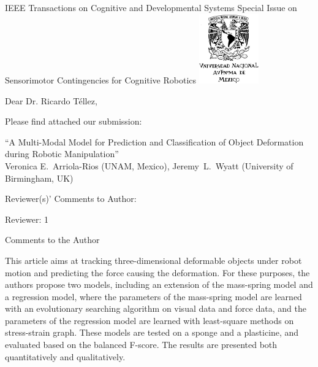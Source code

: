 \documentclass[a4paper,12pt]{letter}
\newcommand{\comment}[1]{\textcolor{blue}{#1}}
\begin{document}

\begin{letter}{IEEE Transactions on Cognitive and Developmental Systems\newline
Special Issue on Sensorimotor Contingencies for Cognitive Robotics}
\includegraphics[height=3cm, keepaspectratio=true]{figures/unam.jpg}\vspace*{-3cm}
\address{Facultad de Ciencias, \\Ciudad Universitaria,\\ UNAM, México, D.F.}

\opening{Dear Dr. Ricardo Téllez,}

Please find attached our submission:
\begin{center}
 ``A Multi-Modal Model for Prediction and Classification of Object Deformation during Robotic Manipulation'' \\
 Veronica E.~Arriola-Rios (UNAM, Mexico), Jeremy~L.~Wyatt (University of Birmingham, UK)
\end{center}

Reviewer(s)' Comments to Author: 

Reviewer: 1 

Comments to the Author 

This article aims at tracking three-dimensional deformable objects under robot motion and predicting the force causing the deformation.
%
%
For these purposes, the authors propose two models, including an extension of the mass-spring model and a regression model, where the parameters of the mass-spring model are learned with an evolutionary searching algorithm on visual data and force data, and the parameters of the regression model are learned with least-square methods on stress-strain graph. These models are tested on a sponge and a plasticine, and evaluated based on the balanced F-score. The results are presented both quantitatively and qualitatively. 


\end{letter}
\end{document}
